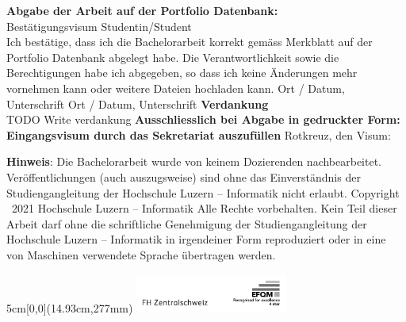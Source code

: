 \newpage
\noindent
\textbf{Abgabe der Arbeit auf der Portfolio Datenbank:}\\
Best\"atigungsvisum Studentin/Student\\
Ich best\"atige, dass ich die Bachelorarbeit korrekt gem\"ass Merkblatt auf der Portfolio Datenbank abgelegt habe. Die Verantwortlichkeit sowie die Berechtigungen habe ich abgegeben, so dass ich keine \"Anderungen mehr vornehmen kann oder weitere Dateien hochladen kann. \newline \newline
Ort / Datum, Unterschrift       \underline{\hspace*{4cm}} \newline \newline
Ort / Datum, Unterschrift   \underline{\hspace*{4cm}} \newline \newline \newline
\textbf{Verdankung}\\
{\color{red}TODO Write verdankung} \newline \newline \newline
\noindent
{\textbf{Ausschliesslich bei Abgabe in gedruckter Form: \\
Eingangsvisum durch das Sekretariat auszuf\"ullen}} \newline \newline
Rotkreuz, den   \underline{\hspace*{4cm}} \hspace*{1cm} Visum:  \underline{\hspace*{4cm}} \vspace*{10cm}


\noindent
{\textbf{Hinweis}}: Die Bachelorarbeit wurde von keinem Dozierenden nachbearbeitet. Ver\"offentlichungen (auch auszugsweise) sind ohne das Einverst\"andnis der Studiengangleitung der Hochschule Luzern -- Informatik nicht erlaubt. \newline \newline
Copyright \textcopyright\ 2021 Hochschule Luzern -- Informatik \newline \newline
Alle Rechte vorbehalten. Kein Teil dieser Arbeit darf ohne die schriftliche Genehmigung der Studiengangleitung der Hochschule Luzern -- Informatik in irgendeiner Form reproduziert oder in eine von Maschinen verwendete Sprache \"ubertragen werden.

\begin{textblock*}{5cm}[0,0](14.93cm,277mm)
	\includegraphics[keepaspectratio,width=5cm]{img/FHZ_Logo}
\end{textblock*}

\newpage
{}

